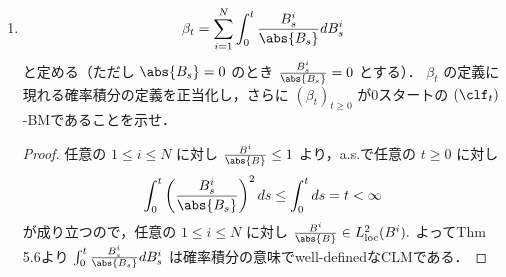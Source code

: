 \documentclass{jsarticle}
\begin{document}
\begin{enumerate}
\begin{proof}
        次に $(\sum_{i=1}^{N}\int_{0}^{t}2B_s^i dB_s^i)_{t\ge0}$ がtrue martingaleであることを示す．
        Doob's ineq. in $L^2$ より
        \begin{align}
            E[\gen{\sum_{i=1}^{N}\int_{0}^{\cdot}2B_s^i dB_s^i, \sum_{i=1}^{N}\int_{0}^{\cdot}2B_s^i dB_s^i}_t]
            &= E[\sum_{i=1}^{N}\int_{0}^{t}(2B_s^i)^2 ds] \\
            &\le 4t\sum_{i=1}^{N}E[\sup_{0\le s\le t}(B_s^i)^2] \\
            &\le 4t2^2\sum_{i=1}^{N}E[(B_s^i)^2] \\
            &= 16t(\abs{x}^2+Nt).
        \end{align}
        \begin{screen}
            $\because)$
            任意の $1\le i\le N$ に対し
            \begin{align}
                t
                &= E[(B_t^i-x_i)^2] \\
                &= E[(B_t^i)^2]
                - 2x_iE[B_t^i]
                + E[x_i^2] \\
                &= E[(B_t^i)^2] - x_i^2
            \end{align}
            より $E[(B_t^i)^2]=x_i^2+t.$
        \end{screen}

        よってThm. 4.13(ii)より $(\sum_{i=1}^{N}\int_{0}^{t}2B_s^i dB_s^i)_{t\ge0}$ はtrue martingale.
    \end{proof}
    
    \item
    \begin{align}
        \beta_t
        = \sum_{i=1}^{N}\int_{0}^{t}\frac{B_{s}^{i}}{\abs{B_s}}dB_s^i
    \end{align}
    と定める（ただし $\abs{B_s}=0$ のとき $\frac{B_{s}^{i}}{\abs{B_s}}=0$ とする）．
    $\beta_t$ の定義に現れる確率積分の定義を正当化し，さらに $(\beta_t)_{t\ge0}$ が0スタートの $(\clf_t)$-BMであることを示せ．
    \begin{proof}
        任意の $1\le i\le N$ に対し $\frac{B^i}{\abs{B}}\le1$ より，a.s.で任意の $t\ge0$ に対し
        \begin{align}
            \int_0^t \left(\frac{B_s^i}{\abs{B_s}}\right)^2 ds
            \le \int_0^t ds = t < \infty
        \end{align}
        が成り立つので，任意の $1\le i\le N$ に対し $\frac{B^i}{\abs{B}}\in L_{\mathrm{loc}}^2(B^i).$
        よってThm 5.6より $\int_{0}^{t}\frac{B_{s}^{i}}{\abs{B_s}}dB_s^i$ は確率積分の意味でwell-definedなCLMである．


\end{proof}
\end{enumerate}
\end{document}
